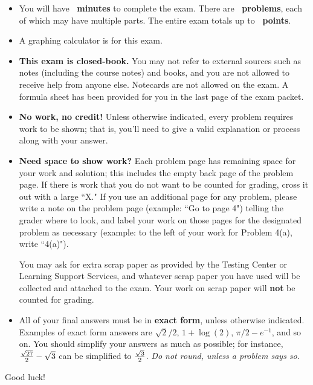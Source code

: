\begin{tcolorbox}[enhanced,attach boxed title to top center=
	{yshift=-2mm,yshifttext=-1mm},colback=white,colframe=black,colbacktitle=black,title={\textbf{Instructions for the exam}}]
	\begin{itemize}
		\item You will have \textbf{\ minutes} to complete the exam. There are \textbf{\ problems}, each of which may have multiple parts. The entire exam totals up to \textbf{\ points}.
		
		\item A graphing calculator is \emph{} for this exam.
		\item \textbf{This exam is closed-book.} You may not refer to external sources such as notes (including the course notes) and books, and you are not allowed to receive help from anyone else. Notecards are not allowed on the exam. 
		A formula sheet has been provided for you in the last page of the exam packet.
		
		\item \textbf{No work, no credit!} Unless otherwise indicated, every problem requires work to be shown; that is, you'll need to give a valid explanation or process along with your answer. 
		\item \textbf{Need space to show work?} Each problem page has remaining space for your work and solution; this includes the empty back page of the problem page. If there is work that you do not want to be counted for grading, cross it out with a large ``X." If you use an additional page for any problem, please write a note on the problem page (example: ``Go to page 4") telling the grader where to look, and label your work on those pages for the designated problem as necessary (example: to the left of your work for Problem 4(a), write ``4(a)").
		
		You may ask for extra scrap paper as provided by the Testing Center or Learning Support Services, and whatever scrap paper you have used will be collected and attached to the exam. Your work on scrap paper will \textbf{not} be counted for grading.
		\item All of your final answers must be in \textbf{exact form}, unless otherwise indicated. Examples of exact form answers are $\sqrt{2}/2$, $1+\log(2)$, $\pi/2-e^{-1}$, and so on. You should simplify your answers as much as possible; 
		for instance, $\frac{\sqrt{27}}{2}-\sqrt{3}$ can be simplified to $\frac{\sqrt{3}}{2}$.
		\emph{Do not round, unless a problem says so.}
	\end{itemize}
	\centering \Large{Good luck!} 
	\vspace*{1em}
\end{tcolorbox}